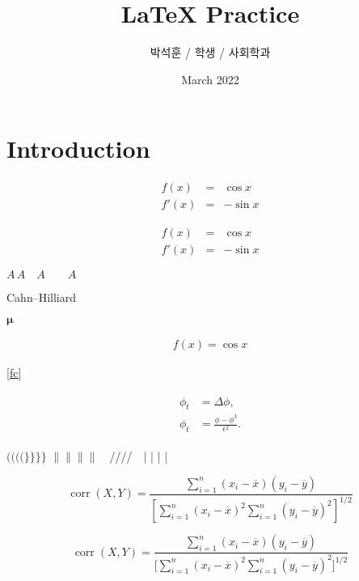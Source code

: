 \documentclass{article}
\begin{document}
\title{LaTeX Practice}
\author{박석훈 / 학생 / 사회학과 }
\date{March 2022}

\maketitle

\section{Introduction}

\begin{eqnarray}
f(x) & = & \cos x \\
f'(x) & = & -\sin x
\end{eqnarray}

{\setlength\arraycolsep{2pt}
\begin{eqnarray}
f(x) & = & \cos x \\
f'(x) & = & -\sin x
\end{eqnarray}}


$ A \, A \quad A \qquad A $

Cahn--Hilliard

$\boldsymbol{\mu}$

\begin{eqnarray}
f(x) = \cos x \label{fc}
\end{eqnarray}

\eqref{fc}

\begin{align}
    \begin{split}
        \phi_t&=\Delta \phi, \\
        \phi_t&=\frac{\phi-\phi^3}{\epsilon^2}.\label{gv_eq}
    \end{split}
\end{align}

$\big(\Big(\bigg(\Bigg($\quad $\big\}\Big\}\bigg\}\Bigg\}$
 \quad $\big\|\Big\|\bigg\|\Bigg\| \quad
$\big/\Big/\bigg/\Bigg/$ \quad $\big| \Big| \bigg| \Bigg|

\begin{displaymath}
\mathop{\mathrm{corr}}(X, Y) = \frac{\displaystyle
\sum_{i=1}^n(x_i-\overline x) (y_i-\overline y)}
{\displaystyle\left[ \sum_{i=1}^n(x_i-\overline x)^2
\sum_{i=1}^n(y_i-\overline y)^2 \right]^{1/2}}
\end{displaymath}

\begin{displaymath}
\mathop{\mathrm{corr}}(X, Y)= \frac{\displaystyle
\sum_{i=1}^n(x_i-\overline x) (y_i-\overline y)}
{\displaystyle\biggl[ \sum_{i=1}^n(x_i-\overline x)^2
\sum_{i=1}^n(y_i-\overline y)^2 \biggr]^{1/2}}
\end{displaymath}
\end{document}
